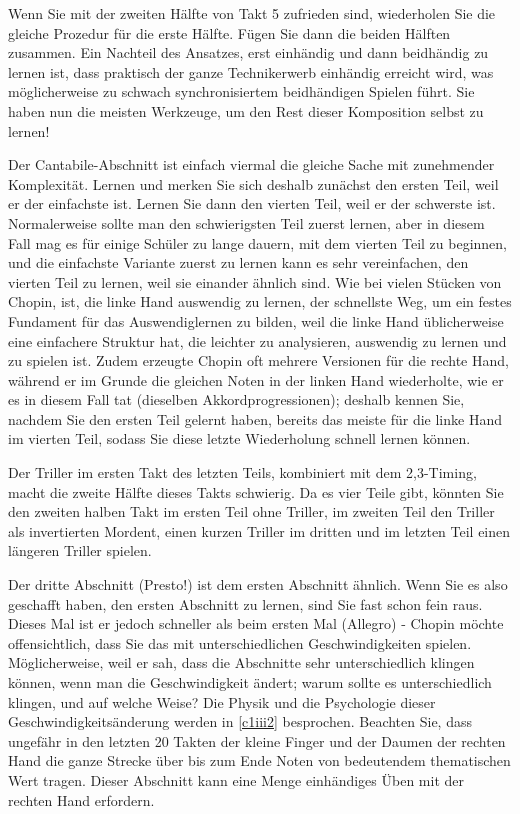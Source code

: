 Wenn Sie mit der zweiten Hälfte von Takt 5 zufrieden sind, wiederholen Sie die gleiche Prozedur für die erste Hälfte.
Fügen Sie dann die beiden Hälften zusammen.
Ein Nachteil des Ansatzes, erst einhändig und dann beidhändig zu lernen ist, dass praktisch der ganze Technikerwerb einhändig erreicht wird, was möglicherweise zu schwach synchronisiertem beidhändigen Spielen führt.
Sie haben nun die meisten Werkzeuge, um den Rest dieser Komposition selbst zu lernen!

Der Cantabile-Abschnitt ist einfach viermal die gleiche Sache mit zunehmender Komplexität.
Lernen und merken Sie sich deshalb zunächst den ersten Teil, weil er der einfachste ist.
Lernen Sie dann den vierten Teil, weil er der schwerste ist.
Normalerweise sollte man den schwierigsten Teil zuerst lernen, aber in diesem Fall mag es für einige Schüler zu lange dauern, mit dem vierten Teil zu beginnen, und die einfachste Variante zuerst zu lernen kann es sehr vereinfachen, den vierten Teil zu lernen, weil sie einander ähnlich sind.
Wie  bei vielen Stücken von Chopin, ist, die linke Hand auswendig zu lernen, der schnellste Weg, um ein festes Fundament für das Auswendiglernen zu bilden, weil die linke Hand üblicherweise eine einfachere Struktur hat, die leichter zu analysieren, auswendig zu lernen und zu spielen ist.
Zudem erzeugte Chopin oft mehrere Versionen für die rechte Hand, während er im Grunde die gleichen Noten in der linken Hand wiederholte, wie er es in diesem Fall tat (dieselben Akkordprogressionen);
deshalb kennen Sie, nachdem Sie den ersten Teil gelernt haben, bereits das meiste für die linke Hand im vierten Teil, sodass Sie diese letzte Wiederholung schnell lernen können.

Der Triller im ersten Takt des letzten Teils, kombiniert mit dem 2,3-Timing, macht die zweite Hälfte dieses Takts schwierig.
Da es vier Teile gibt, könnten Sie den zweiten halben Takt im ersten Teil ohne Triller, im zweiten Teil den Triller als invertierten Mordent, einen kurzen Triller im dritten und im letzten Teil einen längeren Triller spielen.

Der dritte Abschnitt (Presto!) ist dem ersten Abschnitt ähnlich.
Wenn Sie es also geschafft haben, den ersten Abschnitt zu lernen, sind Sie fast schon fein raus.
Dieses Mal ist er jedoch schneller als beim ersten Mal (Allegro) - 
Chopin möchte offensichtlich, dass Sie das mit unterschiedlichen Geschwindigkeiten spielen.
Möglicherweise, weil er sah, dass die Abschnitte sehr unterschiedlich klingen können, wenn man die Geschwindigkeit ändert;
warum sollte es unterschiedlich klingen, und auf welche Weise?
Die Physik und die Psychologie dieser Geschwindigkeitsänderung werden in \hyperref[c1iii2]{\autoref{c1iii2}} besprochen.
Beachten Sie, dass ungefähr in den letzten 20 Takten der kleine Finger und der Daumen der rechten Hand die ganze Strecke über bis zum Ende Noten von bedeutendem thematischen Wert tragen.
Dieser Abschnitt kann eine Menge einhändiges Üben mit der rechten Hand erfordern.



